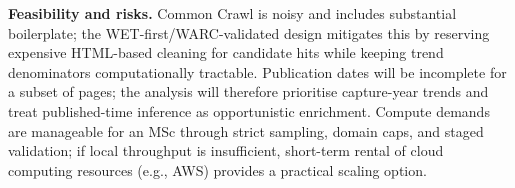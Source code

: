 \documentclass[12pt,letterpaper]{article}
\begin{document}
	\textbf{Feasibility and risks.} Common Crawl is noisy and includes substantial boilerplate; the WET-first/WARC-validated design mitigates this by reserving expensive HTML-based cleaning for candidate hits while keeping trend denominators computationally tractable. Publication dates will be incomplete for a subset of pages; the analysis will therefore prioritise capture-year trends and treat published-time inference as opportunistic enrichment. Compute demands are manageable for an MSc through strict sampling, domain caps, and staged validation; if local throughput is insufficient, short-term rental of cloud computing resources (e.g., AWS) provides a practical scaling option.
	
	\newpage
	
	
	
\end{document}
